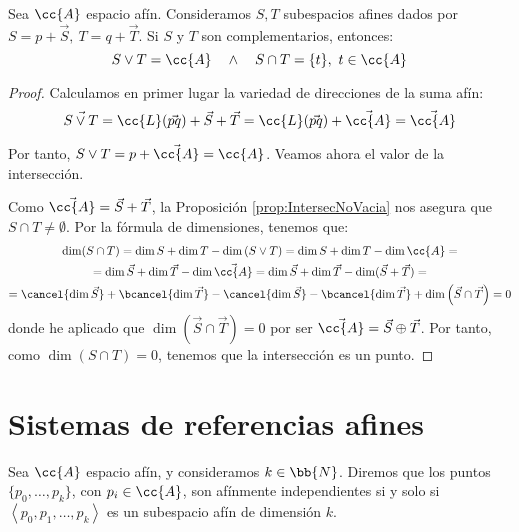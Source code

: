 \begin{prop}\label{prop:ComplementariosSumaIntersec}
    Sea $\cc{A}$ espacio afín. Consideramos $S,T$ subespacios afines dados por $S=p+\vec{S},~T=q+\vec{T}$. Si $S$ y $T$ son complementarios, entonces:
    $$S\vee T=\cc{A} \quad \land \quad S\cap T=\{t\}, ~t\in \cc{A}$$
\end{prop}
\begin{proof}
    Calculamos en primer lugar la variedad de direcciones de la suma afín:
    \begin{equation*}
        \vec{S\vee T} = \cc{L}(\vec{pq}) + \vec{S} + \vec{T} = \cc{L}(\vec{pq}) + \vec{\cc{A}} = \vec{\cc{A}}
    \end{equation*}

    Por tanto, $S\vee T=p+\vec{\cc{A}}=\cc{A}$. Veamos ahora el valor de la intersección.
    
    Como $\vec{\cc{A}}=\vec{S} + \vec{T}$, la Proposición \ref{prop:IntersecNoVacia} nos asegura que $S\cap T\neq \emptyset$. Por la fórmula de dimensiones, tenemos que:
    \begin{multline*}
        \dim (S\cap T)= \dim S + \dim T - \dim \left(S\vee T\right) = \dim S + \dim T - \dim \cc{A}
        =\\= \dim \vec{S} + \dim \vec{T} - \dim \vec{\cc{A}}
        = \dim \vec{S} + \dim \vec{T} - \dim (\vec{S} + \vec{T}) =\\
        = \cancel{\dim \vec{S}} + \bcancel{\dim \vec{T}} -\cancel{\dim \vec{S}} - \bcancel{\dim \vec{T}} +\dim \left(\vec{S} \cap \vec{T}\right)= 0
    \end{multline*}
    donde he aplicado que $\dim \left(\vec{S} \cap \vec{T}\right)= 0$ por ser $\vec{\cc{A}}=\vec{S}\oplus \vec{T}$.
    Por tanto, como $\dim(S\cap T)=0$, tenemos que la intersección es un punto.
\end{proof}




\section{Sistemas de referencias afines}
\begin{definicion}
    Sea $\cc{A}$ espacio afín, y consideramos $k\in \bb{N}$.
    Diremos que los puntos $\{p_0,\dots, p_k\}$, con $p_i\in \cc{A}$, son afínmente independientes si y solo si $\left\langle p_0, p_1,\dots, p_k\right\rangle$ es un subespacio afín de dimensión $k$.
\end{definicion}

